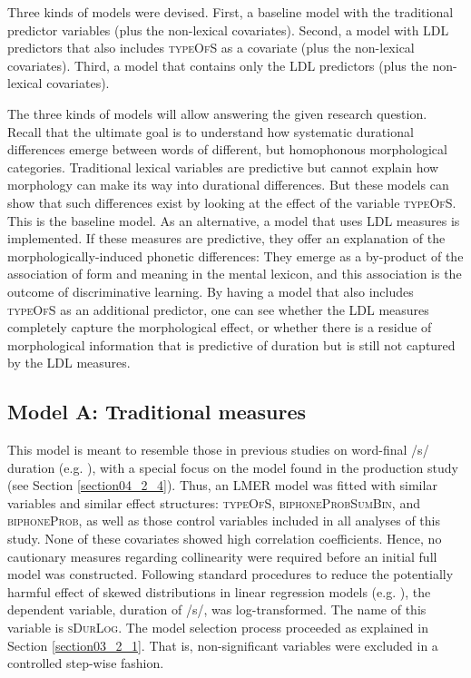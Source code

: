 Three kinds of models were devised. First, a baseline model with the traditional predictor variables (plus the non-lexical covariates). Second, a model with LDL predictors that also includes \textsc{typeOfS} as a covariate (plus the non-lexical covariates). Third, a model that contains only the LDL predictors (plus the non-lexical covariates).

The three kinds of models will allow answering the given research question. Recall that the ultimate goal is to understand how systematic durational differences emerge between words of different, but homophonous morphological categories. Traditional lexical variables are predictive but cannot explain how morphology can make its way into durational differences. But these models can show that such differences exist by looking at the effect of the variable \textsc{typeOfS}. This is the baseline model. As an alternative, a model that uses LDL measures is implemented. If these measures are predictive, they offer an explanation of the morphologically-induced phonetic differences: They emerge as a by-product of the association of form and meaning in the mental lexicon, and this association is the outcome of discriminative learning. By having a model that also includes \textsc{typeOfS} as an additional predictor, one can see whether the LDL measures completely capture the morphological effect, or whether there is a residue of morphological information that is predictive of duration but is still not captured by the LDL measures.

\subsection{Model A: Traditional measures}\label{section05_2_4}

This model is meant to resemble those in previous studies on word-final /s/ duration (e.g. \cite{Plag2017}), with a special focus on the model found in the production study (see Section \ref{section04_2_4}). Thus, an LMER model was fitted with similar variables and similar effect structures: \textsc{typeOfS}, \textsc{biphoneProbSumBin}, and \textsc{biphoneProb}, as well as those control variables included in all analyses of this study. None of these covariates showed high correlation coefficients. Hence, no cautionary measures regarding collinearity were required before an initial full model was constructed. Following standard procedures to reduce the potentially harmful effect of skewed distributions in linear regression models (e.g. \cite{Winter2019}), the dependent variable, duration of /s/, was log-transformed. The name of this variable is \textsc{sDurLog}. The model selection process proceeded as explained in Section \ref{section03_2_1}. That is, non-significant variables were excluded in a controlled step-wise fashion. 

